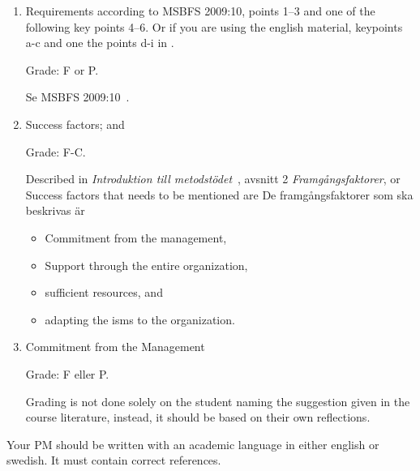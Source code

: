 \documentclass[a4paper]{article}
\begin{document}
\begin{enumerate}
  \item Requirements according to MSBFS 2009:10, points 1--3 and one of the
    following key points 4--6. Or if you are using the english material,
    keypoints a-c and one the points d-i in \cite[chap. 3.2.1]{iso27000}.
    \begin{solution}
      Grade: F or P.

      Se MSBFS 2009:10~\cite{MSBFS2009:10}.
    \end{solution}

  \item Success factors; and
    \begin{solution}
      Grade: F-C.

      Described in \emph{Introduktion till metodstödet}~\cite{MSB2011itm}, avsnitt 
      2 \emph{Framgångsfaktorer}, or \cite[3.6]{iso27000}
      Success factors that needs to be mentioned are
      De framgångsfaktorer som ska beskrivas är
      \begin{itemize}
        \item Commitment from the management,
        \item Support through the entire organization,
        \item sufficient resources, and
        \item adapting the \ac{isms} to the organization.
      \end{itemize}
    \end{solution}

  \item Commitment from the Management
    \begin{solution}
      Grade: F eller P.
      
      Grading is not done solely on the student naming the suggestion given in
      the course literature, instead, it should be based on their own
      reflections.
    \end{solution}
\end{enumerate}

Your PM should be written with an academic language in either english or
swedish. It must contain correct references.

\printbibliography{}
\end{document}
